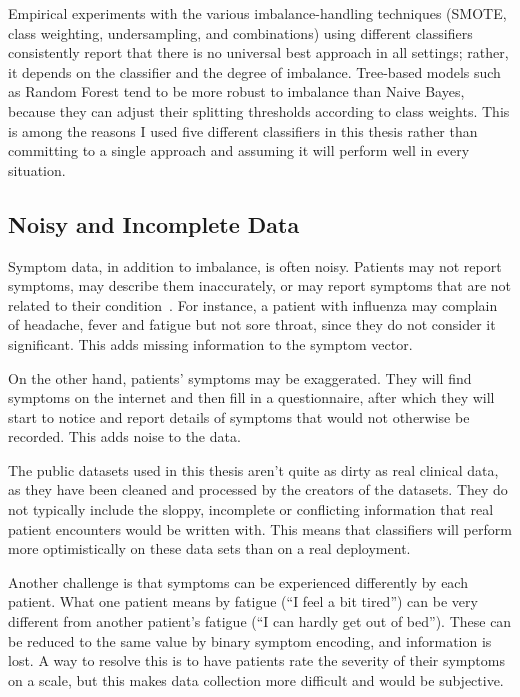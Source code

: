 Empirical experiments with the various imbalance-handling techniques (SMOTE, class weighting, undersampling, and combinations) using different classifiers consistently report that there is no universal best approach in all settings; rather, it depends on the classifier and the degree of imbalance. Tree-based models such as Random Forest tend to be more robust to imbalance than Naive Bayes, because they can adjust their splitting thresholds according to class weights. This is among the reasons I used five different classifiers in this thesis rather than committing to a single approach and assuming it will perform well in every situation.

\subsection{Noisy and Incomplete Data}

Symptom data, in addition to imbalance, is often noisy. Patients may not report symptoms, may describe them inaccurately, or may report symptoms that are not related to their condition~\citep{Ahsan2022}. For instance, a patient with influenza may complain of headache, fever and fatigue but not sore throat, since they do not consider it significant. This adds missing information to the symptom vector.

On the other hand, patients' symptoms may be exaggerated. They will find symptoms on the internet and then fill in a questionnaire, after which they will start to notice and report details of symptoms that would not otherwise be recorded. This adds noise to the data.

The public datasets used in this thesis aren't quite as dirty as real clinical data, as they have been cleaned and processed by the creators of the datasets. They do not typically include the sloppy, incomplete or conflicting information that real patient encounters would be written with. This means that classifiers will perform more optimistically on these data sets than on a real deployment.

Another challenge is that symptoms can be experienced differently by each patient. What one patient means by fatigue (``I feel a bit tired'') can be very different from another patient's fatigue (``I can hardly get out of bed''). These can be reduced to the same value by binary symptom encoding, and information is lost. A way to resolve this is to have patients rate the severity of their symptoms on a scale, but this makes data collection more difficult and would be subjective.


